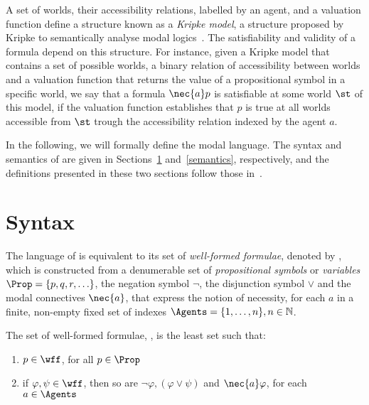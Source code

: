 A set of worlds, their accessibility relations, labelled by an agent, and a
valuation function define a structure known as a \emph{Kripke model}, a
structure proposed by Kripke to semantically analyse modal
logics~\cite{kripke:i}. The satisfiability and validity of a formula depend on
this structure. For instance, given a Kripke model that contains a set of
possible worlds, a binary relation of accessibility between worlds and a
valuation function that returns the value of a propositional symbol in a
specific world, we say that a formula $\nec{a}p$ is satisfiable at some world
$\st$ of this model, if the valuation function establishes that $p$ is true at
all worlds accessible from $\st$ trough the accessibility relation indexed by
the agent $a$.

In the following, we will formally define the modal language. The
syntax and semantics of  are given in Sections~\ref{syntax}
and~\ref{semantics}, respectively, and the definitions presented in these two
sections follow those in~\cite{journals/jal/NalonD07}.

\section{Syntax}%
\label{syntax}

The language of  is equivalent to its set of \emph{well-formed
formulae}, denoted by \wff, which is constructed from a denumerable set of
\emph{propositional symbols} or \emph{variables} $\Prop = \{p, q, r, \ldots\}$,
the negation symbol $\neg$, the disjunction symbol $\lor$ and the modal
connectives $\nec{a}$, that express the notion of necessity, for each $a$
in a finite, non-empty fixed set of indexes $\Agents = \{1, \ldots, n\}, n \in
\mathbb{N}$.

\begin{definition}%
\label{def:wff}
    The set of well-formed formulae, \wff, is the least set such that:
    \begin{enumerate}
        \item $p \in \wff$, for all $p \in \Prop$
            \vspace{.2ex}
        \item if $\varphi, \psi \in \wff$, then so are $\neg \varphi, (\varphi
            \lor \psi)$ and $\nec{a} \varphi$, for each $a \in \Agents$
    \end{enumerate}
\end{definition}

